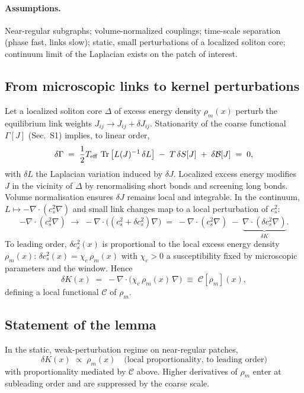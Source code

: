 \documentclass[11pt]{article}
\begin{document}
\paragraph{Assumptions.} Near-regular subgraphs; volume-normalized couplings; time-scale separation (phase fast, links slow); static, small perturbations of a localized soliton core; continuum limit of the Laplacian exists on the patch of interest.

\subsection*{From microscopic links to kernel perturbations}
Let a localized soliton core $\Delta$ of excess energy density $\rho_m(x)$ perturb the equilibrium link weights $J_{ij}\to J_{ij}+\delta J_{ij}$. Stationarity of the coarse functional $\Gamma[J]$ (Sec.~S1) implies, to linear order,
\begin{equation}
  \delta \Gamma \;=\; \frac{1}{2} T_{\rm eff}\,\Tr\big[L(J)^{-1}\,\delta L\big] \; -\; T\,\delta S[J] \; +\; \delta\mathcal B[J] \;=\; 0,
\end{equation}
with $\delta L$ the Laplacian variation induced by $\delta J$. Localized excess energy modifies $J$ in the vicinity of $\Delta$ by renormalising short bonds and screening long bonds. Volume normalisation ensures $\delta J$ remains local and integrable. In the continuum, $L\mapsto -\nabla\!\cdot(c_s^2\nabla)$ and small link changes map to a local perturbation of $c_s^2$:
\begin{equation}
  -\nabla\!\cdot(c_s^2\nabla) \;\longrightarrow\; -\nabla\!\cdot\big((c_s^2+\delta c_s^2)\nabla\big) \;=\; -\nabla\!\cdot(c_s^2\nabla)\; -\; \underbrace{\nabla\!\cdot(\delta c_s^2\nabla)}_{\delta K}.
\end{equation}
To leading order, $\delta c_s^2(x)$ is proportional to the local excess energy density $\rho_m(x)$: $\delta c_s^2(x)=\chi_c\,\rho_m(x)$ with $\chi_c>0$ a susceptibility fixed by microscopic parameters and the window. Hence
\begin{equation}
  \delta K(x) \;=\; -\nabla\!\cdot\big(\chi_c\,\rho_m(x)\,\nabla\big) \;\equiv\; \mathcal C[\rho_m](x),
\end{equation}
defining a local functional $\mathcal C$ of $\rho_m$.

\subsection*{Statement of the lemma}
In the static, weak-perturbation regime on near-regular patches,
\begin{equation}
  \boxed{\quad \delta K(x) \;\propto\; \rho_m(x) \quad \text{(local proportionality, to leading order)}\quad}
\end{equation}
with proportionality mediated by $\mathcal C$ above. Higher derivatives of $\rho_m$ enter at subleading order and are suppressed by the coarse scale.
\end{document}

